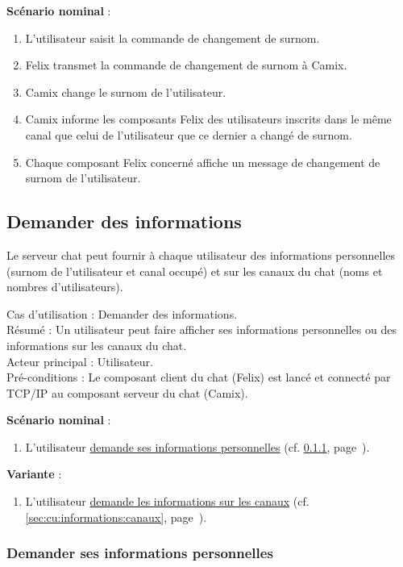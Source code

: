 \medskip
\textbf{Scénario nominal} :
\begin{enumerate}
\item L'utilisateur saisit la commande de changement de surnom.
\item Felix transmet la commande de changement de surnom à Camix.
\item Camix change le surnom de l'utilisateur.
\item Camix informe les composants Felix des utilisateurs inscrits dans le même canal que celui de l'utilisateur que ce dernier a changé de surnom.
\item Chaque composant Felix concerné affiche un message de changement de surnom de l'utilisateur.
\end{enumerate}

\subsection{Demander des informations}
\label{sec:cu:informations}

Le serveur chat peut fournir à chaque utilisateur des informations personnelles (surnom de l'utilisateur et canal occupé) et sur les canaux du chat (noms et nombres d'utilisateurs).  

\medskip
\noindent
Cas d'utilisation : Demander des informations.\\
Résumé : Un utilisateur peut faire afficher ses informations personnelles ou des informations sur les canaux du chat. \\
Acteur principal : Utilisateur.\\
Pré-conditions : Le composant client du chat (Felix) est lancé et connecté par TCP/IP au composant serveur du chat (Camix).

\medskip
\textbf{Scénario nominal} :
\begin{enumerate}
\item L'utilisateur \underline{demande ses informations personnelles} (cf. \ref{sec:cu:informations:personnelles}, page~\pageref{sec:cu:informations:personnelles}).
\end{enumerate}

\medskip
\textbf{Variante} :
\begin{enumerate}
\item[1.a] L'utilisateur \underline{demande les informations sur les canaux} (cf. \ref{sec:cu:informations:canaux}, page~\pageref{sec:cu:informations:canaux}).
\end{enumerate}

\subsubsection{Demander ses informations personnelles}
\label{sec:cu:informations:personnelles}

